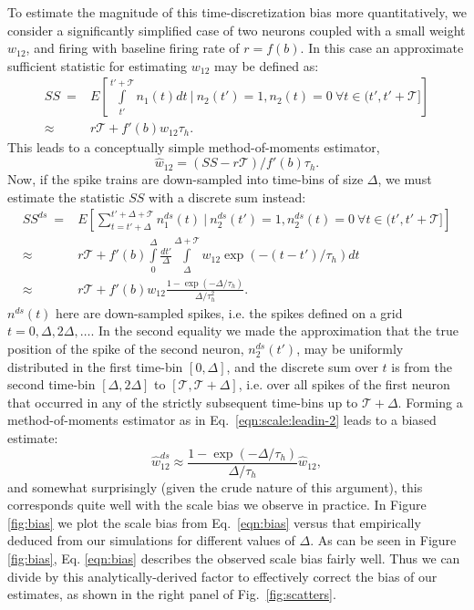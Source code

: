 \documentclass[aoas,preprint]{imsart}
\begin{document}
To estimate the magnitude of this time-discretization bias more
quantitatively, we consider a significantly simplified case of two
neurons coupled with a small weight $w_{12}$, and firing with baseline
firing rate of $r=f(b)$.  In this case an approximate sufficient
statistic for estimating $w_{12}$ may be defined as:
\begin{equation}\label{eqn:scale:leadin-1}
\begin{array}{rl}
SS ~ =& E\left[\int\limits_{t'}^{t'+\mathcal{T}} n_1(t) dt ~ \bigg| ~
n_2(t')=1, n_2(t)=0 ~ \forall
t \in (t',t'+\mathcal{T}] \right] \\ \approx & r
\mathcal{T} + f'(b) w_{12}\tau_h.
\end{array}
\end{equation}
This leads to a conceptually simple method-of-moments estimator,
\begin{equation}\label{eqn:scale:leadin-2}
\hat w_{12}=(SS-r\mathcal{T})/f'(b)\tau_h.
\end{equation}
Now, if the spike trains are down-sampled into time-bins of size $\Delta$,
we must estimate the statistic $SS$ with a discrete sum instead:
\begin{equation}\label{eqn:scale:leadin-3}
\begin{array}{rl}
SS^{ds} ~ = &E\left[\sum\limits_{t=t'+\Delta}^{t'+\Delta +
  \mathcal{T}} n^{ds}_1(t) ~ \bigg| ~ n^{ds}_2(t')=1, n^{ds}_2(t)=0\
  \forall t \in (t',t'+\mathcal{T}] \right] \\ \approx& r \mathcal{T}
  + f'(b) \int\limits_0^\Delta \frac{dt'}{\Delta}
  \int\limits_{\Delta}^{\Delta + \mathcal{T}}
  w_{12}\exp(-(t-t')/\tau_h) dt \\ \approx & r \mathcal{T} +
  f'(b)w_{12}\frac{1-\exp(-\Delta/\tau_h)}{\Delta/\tau_h^2}.
\end{array}
\end{equation}
$n^{ds}(t)$ here are down-sampled spikes, i.e. the spikes defined on a
grid $t=0,\Delta,2\Delta,\ldots$.  In the second equality we made the
approximation that the true position of the spike of the second
neuron, $n^{ds}_2(t')$, may be uniformly distributed in the first
time-bin $[0,\Delta]$, and the discrete sum over $t$ is from the
second time-bin $[\Delta,2\Delta]$ to
$[\mathcal{T},\mathcal{T}+\Delta]$, i.e. over all spikes of the first
neuron that occurred in any of the strictly subsequent time-bins up to
$\mathcal{T} + \Delta$.  Forming a method-of-moments estimator as in
Eq.~\ref{eqn:scale:leadin-2} leads to a biased estimate:
\begin{equation}\label{eqn:bias}
\hat w_{12}^{ds}\approx \frac{1-\exp(-\Delta/\tau_h)}{\Delta/\tau_h}
\hat w_{12},
\end{equation}
and somewhat surprisingly (given the crude nature of this argument),
this corresponds quite well with the scale bias we observe in
practice.  In Figure \ref{fig:bias} we plot the scale bias from
Eq.~\ref{eqn:bias} versus that empirically deduced from our
simulations for different values of $\Delta$.  As can be seen in
Figure \ref{fig:bias}, Eq. \ref{eqn:bias} describes the observed scale
bias fairly well.  Thus we can divide by this analytically-derived
factor to effectively correct the bias of our estimates, as shown in
the right panel of Fig.~\ref{fig:scatters}.
\end{document}
